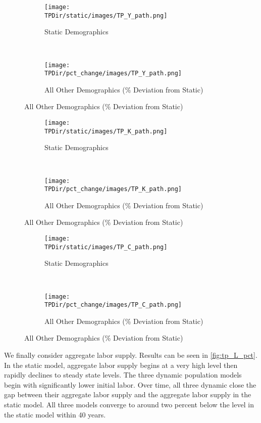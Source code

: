 \documentclass[10pt]{article}
\numberwithin{equation}{subsection}
\newcommand*{\TPDir}{../../code/Rick/OUTPUT/TP}
\begin{document}
\begin{figure}[H]
   \caption{\label{fig:tp_Y_pct}Time Path of Aggregate Output \(\hat{Y}_t\)}
   \begin{subfigure}{0.5\textwidth}
      \centering
      \texttt{[image: \\TPDir/static/images/TP\_Y\_path.png]}
      \caption{Static Demographics}
   \end{subfigure}%
   ~
   \begin{subfigure}{0.5\textwidth}
      \centering
      \texttt{[image: \\TPDir/pct\_change/images/TP\_Y\_path.png]}
      \caption{All Other Demographics (\% Deviation from Static)}
   \end{subfigure}
\end{figure}

\begin{figure}[H]
   \caption{\label{fig:tp_K_pct}Time Path of Aggregate Capital \(\hat{K}_t\)}
   \begin{subfigure}{0.5\textwidth}
      \centering
      \texttt{[image: \\TPDir/static/images/TP\_K\_path.png]}
      \caption{Static Demographics}
   \end{subfigure}%
   ~
   \begin{subfigure}{0.5\textwidth}
      \centering
      \texttt{[image: \\TPDir/pct\_change/images/TP\_K\_path.png]}
      \caption{All Other Demographics (\% Deviation from Static)}
   \end{subfigure}
\end{figure}

\begin{figure}[H]
   \caption{\label{fig:tp_C_pct}Time Path of Aggregate Consumption \(\hat{C}_t\)}
   \begin{subfigure}{0.5\textwidth}
      \centering
      \texttt{[image: \\TPDir/static/images/TP\_C\_path.png]}
      \caption{Static Demographics}
   \end{subfigure}%
   ~
   \begin{subfigure}{0.5\textwidth}
      \centering
      \texttt{[image: \\TPDir/pct\_change/images/TP\_C\_path.png]}
      \caption{All Other Demographics (\% Deviation from Static)}
   \end{subfigure}
\end{figure}

\par We finally consider aggregate labor supply. Results can be seen in \autoref{fig:tp_L_pct}. In the static model, aggregate labor supply begins at a very high level then rapidly declines to steady state levels. The three dynamic population models begin with significantly lower initial labor. Over time, all three dynamic close the gap between their aggregate labor supply and the aggregate labor supply in the static model. All three models converge to around two percent below the level in the static model within 40 years.
\end{document}
